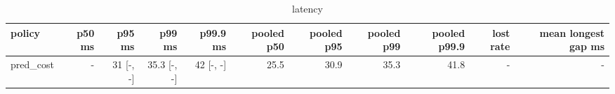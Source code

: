 \begin{table}[t]\centering\small
\begin{tabular}{lrrrrrrrrrr}\toprule
policy & p50 ms & p95 ms & p99 ms & p99.9 ms & pooled p50 & pooled p95 & pooled p99 & pooled p99.9 & lost rate & mean longest gap ms \\\midrule
pred\_cost & - & 31 [-, -] & 35.3 [-, -] & 42 [-, -] & 25.5 & 30.9 & 35.3 & 41.8 & - & - \\
\bottomrule\end{tabular}\caption{latency}\end{table}
